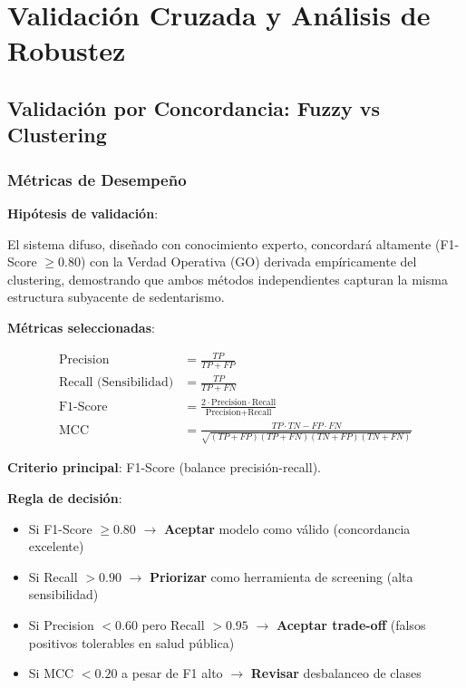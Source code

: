 \documentclass[12pt,letterpaper,twoside]{report}
\begin{document}
\chapter{Validación Cruzada y Análisis de Robustez}

\section{Validación por Concordancia: Fuzzy vs Clustering}

\subsection{Métricas de Desempeño}

\begin{hipotesisbox}
\textbf{Hipótesis de validación}:

El sistema difuso, diseñado con conocimiento experto, concordará altamente (F1-Score $\geq 0.80$) con la Verdad Operativa (GO) derivada empíricamente del clustering, demostrando que ambos métodos independientes capturan la misma estructura subyacente de sedentarismo.
\end{hipotesisbox}

\begin{estadisticobox}
\textbf{Métricas seleccionadas}:

\begin{align}
\text{Precision} &= \frac{TP}{TP + FP} \\
\text{Recall (Sensibilidad)} &= \frac{TP}{TP + FN} \\
\text{F1-Score} &= \frac{2 \cdot \text{Precision} \cdot \text{Recall}}{\text{Precision} + \text{Recall}} \\
\text{MCC} &= \frac{TP \cdot TN - FP \cdot FN}{\sqrt{(TP+FP)(TP+FN)(TN+FP)(TN+FN)}}
\end{align}

\textbf{Criterio principal}: F1-Score (balance precisión-recall).
\end{estadisticobox}

\begin{reglabox}
\textbf{Regla de decisión}:

\begin{itemize}[noitemsep]
    \item Si F1-Score $\geq 0.80$ $\to$ \textbf{Aceptar} modelo como válido (concordancia excelente)
    \item Si Recall $> 0.90$ $\to$ \textbf{Priorizar} como herramienta de screening (alta sensibilidad)
    \item Si Precision $< 0.60$ pero Recall $> 0.95$ $\to$ \textbf{Aceptar trade-off} (falsos positivos tolerables en salud pública)
    \item Si MCC $< 0.20$ a pesar de F1 alto $\to$ \textbf{Revisar} desbalanceo de clases
\end{itemize}
\end{reglabox}
\end{document}
